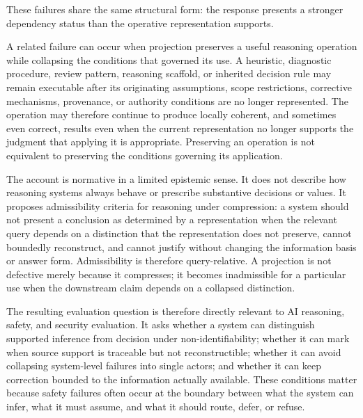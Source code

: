 \documentclass[11pt]{article}
\begin{document}
These failures share the same structural form: the response presents a stronger dependency status than the operative representation supports.

A related failure can occur when projection preserves a useful reasoning operation while collapsing the conditions that governed its use. A heuristic, diagnostic procedure, review pattern, reasoning scaffold, or inherited decision rule may remain executable after its originating assumptions, scope restrictions, corrective mechanisms, provenance, or authority conditions are no longer represented. The operation may therefore continue to produce locally coherent, and sometimes even correct, results even when the current representation no longer supports the judgment that applying it is appropriate. Preserving an operation is not equivalent to preserving the conditions governing its application.

The account is normative in a limited epistemic sense. It does not describe how reasoning systems always behave or prescribe substantive decisions or values. It proposes admissibility criteria for reasoning under compression: a system should not present a conclusion as determined by a representation when the relevant query depends on a distinction that the representation does not preserve, cannot boundedly reconstruct, and cannot justify without changing the information basis or answer form. Admissibility is therefore query-relative. A projection is not defective merely because it compresses; it becomes inadmissible for a particular use when the downstream claim depends on a collapsed distinction.

The resulting evaluation question is therefore directly relevant to AI reasoning, safety, and security evaluation. It asks whether a system can distinguish supported inference from decision under non-identifiability; whether it can mark when source support is traceable but not reconstructible; whether it can avoid collapsing system-level failures into single actors; and whether it can keep correction bounded to the information actually available. These conditions matter because safety failures often occur at the boundary between what the system can infer, what it must assume, and what it should route, defer, or refuse.
\end{document}
